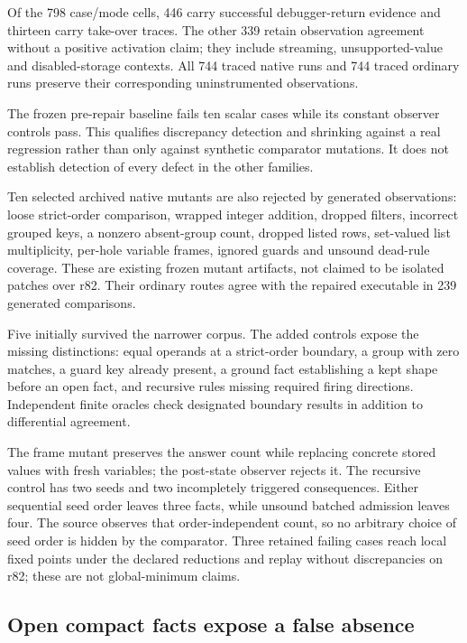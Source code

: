 \documentclass[11pt,a4paper]{article}
\begin{document}
Of the 798 case/mode cells, 446 carry successful debugger-return evidence
and thirteen carry take-over traces. The other 339 retain observation
agreement without a positive activation claim; they include streaming,
unsupported-value and disabled-storage contexts. All 744 traced native runs
and 744 traced ordinary runs preserve their corresponding uninstrumented
observations.

The frozen pre-repair baseline fails ten scalar cases while its constant
observer controls pass. This qualifies discrepancy detection and shrinking
against a real regression rather than only against synthetic comparator
mutations. It does not establish detection of every defect in the other
families.

Ten selected archived native mutants are also rejected by generated
observations: loose strict-order comparison, wrapped integer addition,
dropped filters, incorrect grouped keys, a nonzero absent-group count,
dropped listed rows, set-valued list multiplicity, per-hole variable frames,
ignored guards and unsound dead-rule coverage. These are existing frozen
mutant artifacts, not claimed to be isolated patches over r82. Their ordinary
routes agree with the repaired executable in 239 generated comparisons.

Five initially survived the narrower corpus. The added controls expose the
missing distinctions: equal operands at a strict-order boundary, a group
with zero matches, a guard key already present, a ground fact establishing a
kept shape before an open fact, and recursive rules missing required firing
directions. Independent finite oracles check designated boundary results in
addition to differential agreement.

The frame mutant preserves the answer count while replacing concrete stored
values with fresh variables; the post-state observer rejects it. The recursive
control has two seeds and two incompletely triggered consequences. Either
sequential seed order leaves three facts, while unsound batched admission
leaves four. The source observes that order-independent count, so no arbitrary
choice of seed order is hidden by the comparator. Three retained failing
cases reach local fixed points under the declared reductions and replay
without discrepancies on r82; these are not global-minimum claims.

\subsection{Open compact facts expose a false absence}
\end{document}
